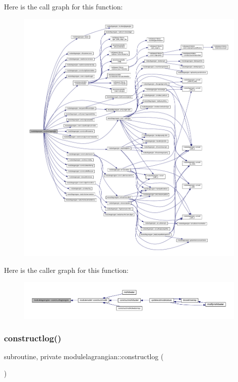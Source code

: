 Here is the call graph for this function\+:\nopagebreak
\begin{figure}[H]
\begin{center}
\leavevmode
\includegraphics[width=350pt]{namespacemodulelagrangian_ad766e71e7390a14dd30513d8ec8ca115_cgraph}
\end{center}
\end{figure}
Here is the caller graph for this function\+:\nopagebreak
\begin{figure}[H]
\begin{center}
\leavevmode
\includegraphics[width=350pt]{namespacemodulelagrangian_ad766e71e7390a14dd30513d8ec8ca115_icgraph}
\end{center}
\end{figure}
\mbox{\label{namespacemodulelagrangian_a6dace26d0d9efdc26334c8afd5ae9220}} 
\subsubsection{\texorpdfstring{constructlog()}{constructlog()}}
{\footnotesize\ttfamily subroutine, private modulelagrangian\+::constructlog (\begin{DoxyParamCaption}{ }\end{DoxyParamCaption})\hspace{0.3cm}{\ttfamily [private]}}

